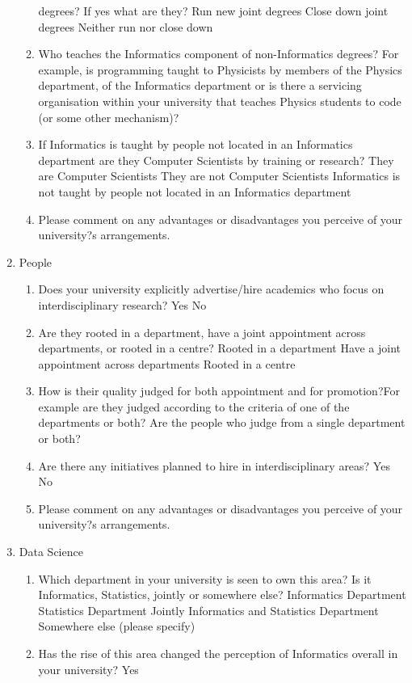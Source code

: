 \begin{enumerate}
\begin{enumerate}
degrees? If yes what are they?
Run new joint degrees
Close down joint degrees
Neither run nor close down
\item Who teaches the Informatics component of non-Informatics degrees? For example, is programming taught to Physicists by members
of the Physics department, of the Informatics department or is there a
servicing organisation within your university that teaches Physics
students to code (or some other mechanism)?
\item If Informatics is taught by people not located in an Informatics
 department are they Computer Scientists by training or research?
They are Computer Scientists
They are not Computer Scientists
Informatics is not taught by people not located in an Informatics department
\item Please comment on any advantages or disadvantages you perceive of your university?s arrangements.
\end{enumerate}
\item People
\begin{enumerate}
\item Does your university explicitly advertise/hire academics who focus
on interdisciplinary research?
Yes
No
\item  Are they rooted in a department, have a joint appointment across
departments, or rooted in a centre?
Rooted in a department
Have a joint appointment across departments
Rooted in a centre
\item How is their quality judged for both appointment and for promotion?For example are they judged according to the criteria of one
of the departments or both? Are the people who judge from a single
department or both?
\item Are there any initiatives planned to hire in interdisciplinary areas?
Yes
No
\item Please comment on any advantages or disadvantages you perceive of your university?s arrangements.
\end{enumerate}
\item Data Science
\begin{enumerate}
\item Which department in your university is seen to own this area? Is it
Informatics, Statistics, jointly or somewhere else?
Informatics Department
Statistics Department
Jointly Informatics and Statistics Department
Somewhere else (please specify)
\item Has the rise of this area changed the perception of Informatics
overall in your university?
Yes

\end{enumerate}
\end{enumerate}

